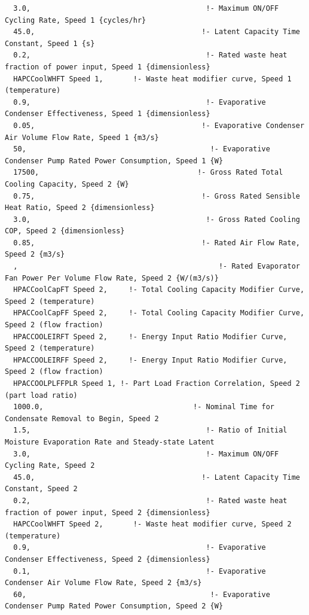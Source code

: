 \begin{lstlisting}
  3.0,                                         !- Maximum ON/OFF Cycling Rate, Speed 1 {cycles/hr}
  45.0,                                       !- Latent Capacity Time Constant, Speed 1 {s}
  0.2,                                         !- Rated waste heat fraction of power input, Speed 1 {dimensionless}
  HAPCCoolWHFT Speed 1,       !- Waste heat modifier curve, Speed 1 (temperature)
  0.9,                                         !- Evaporative Condenser Effectiveness, Speed 1 {dimensionless}
  0.05,                                       !- Evaporative Condenser Air Volume Flow Rate, Speed 1 {m3/s}
  50,                                           !- Evaporative Condenser Pump Rated Power Consumption, Speed 1 {W}
  17500,                                     !- Gross Rated Total Cooling Capacity, Speed 2 {W}
  0.75,                                       !- Gross Rated Sensible Heat Ratio, Speed 2 {dimensionless}
  3.0,                                         !- Gross Rated Cooling COP, Speed 2 {dimensionless}
  0.85,                                       !- Rated Air Flow Rate, Speed 2 {m3/s}
  ,                                               !- Rated Evaporator Fan Power Per Volume Flow Rate, Speed 2 {W/(m3/s)}
  HPACCoolCapFT Speed 2,     !- Total Cooling Capacity Modifier Curve, Speed 2 (temperature)
  HPACCoolCapFF Speed 2,     !- Total Cooling Capacity Modifier Curve, Speed 2 (flow fraction)
  HPACCOOLEIRFT Speed 2,     !- Energy Input Ratio Modifier Curve, Speed 2 (temperature)
  HPACCOOLEIRFF Speed 2,     !- Energy Input Ratio Modifier Curve, Speed 2 (flow fraction)
  HPACCOOLPLFFPLR Speed 1, !- Part Load Fraction Correlation, Speed 2 (part load ratio)
  1000.0,                                   !- Nominal Time for Condensate Removal to Begin, Speed 2
  1.5,                                         !- Ratio of Initial Moisture Evaporation Rate and Steady-state Latent
  3.0,                                         !- Maximum ON/OFF Cycling Rate, Speed 2
  45.0,                                       !- Latent Capacity Time Constant, Speed 2
  0.2,                                         !- Rated waste heat fraction of power input, Speed 2 {dimensionless}
  HAPCCoolWHFT Speed 2,       !- Waste heat modifier curve, Speed 2 (temperature)
  0.9,                                         !- Evaporative Condenser Effectiveness, Speed 2 {dimensionless}
  0.1,                                         !- Evaporative Condenser Air Volume Flow Rate, Speed 2 {m3/s}
  60,                                           !- Evaporative Condenser Pump Rated Power Consumption, Speed 2 {W}

\end{lstlisting}

